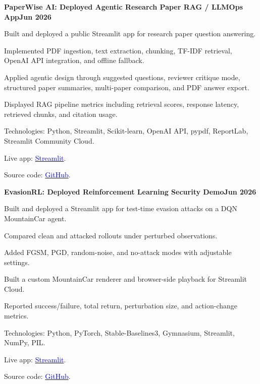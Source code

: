 \documentclass[letterpaper,10pt]{article}
\newcommand{\heading}[2]{
  \hspace{10pt}#1\hfill#2\\
}
\newcommand{\headingBf}[2]{
  \heading{\textbf{#1}}{\textbf{#2}}
}
\newenvironment{resume_list}{
  \vspace{-7pt}
  \begin{itemize}[itemsep=-2px, parsep=1pt, leftmargin=30pt]
}{
  \end{itemize}
}
\begin{document}
\headingBf{PaperWise AI: Deployed Agentic Research Paper RAG / LLMOps App}{Jun 2026}
\begin{resume_list}
\item Built and deployed a public Streamlit app for research paper question answering.
\item Implemented PDF ingestion, text extraction, chunking, TF-IDF retrieval, OpenAI API integration, and offline fallback.
\item Applied agentic design through suggested questions, reviewer critique mode, structured paper summaries, multi-paper comparison, and PDF answer export.
\item Displayed RAG pipeline metrics including retrieval scores, response latency, retrieved chunks, and citation usage.
\item Technologies: Python, Streamlit, Scikit-learn, OpenAI API, pypdf, ReportLab, Streamlit Community Cloud.
\item Live app: \href{https://paperwise-ai.streamlit.app/}{\textcolor{blue}{Streamlit}}.
\item Source code: \href{https://github.com/arashVsh/research-paper-ragops}{\textcolor{blue}{GitHub}}.
\end{resume_list}


\headingBf{EvasionRL: Deployed Reinforcement Learning Security Demo}{Jun 2026}
\begin{resume_list}
\item Built and deployed a Streamlit app for test-time evasion attacks on a DQN MountainCar agent.
\item Compared clean and attacked rollouts under perturbed observations.
\item Added FGSM, PGD, random-noise, and no-attack modes with adjustable settings.
\item Built a custom MountainCar renderer and browser-side playback for Streamlit Cloud.
\item Reported success/failure, total return, perturbation size, and action-change metrics.
\item Technologies: Python, PyTorch, Stable-Baselines3, Gymnasium, Streamlit, NumPy, PIL.
\item Live app: \href{https://arashvsh-evasionrl-app-najahp.streamlit.app/}{\textcolor{blue}{Streamlit}}.
\item Source code: \href{https://github.com/arashVsh/EvasionRL}{\textcolor{blue}{GitHub}}.
\end{resume_list}
\end{document}
